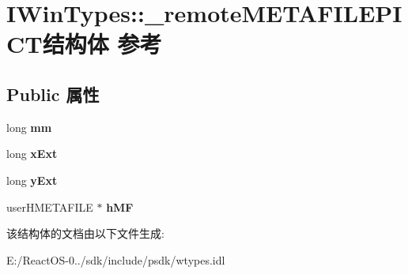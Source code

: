 \hypertarget{struct_i_win_types_1_1__remote_m_e_t_a_f_i_l_e_p_i_c_t}{}\section{I\+Win\+Types\+:\+:\+\_\+remote\+M\+E\+T\+A\+F\+I\+L\+E\+P\+I\+C\+T结构体 参考}
\label{struct_i_win_types_1_1__remote_m_e_t_a_f_i_l_e_p_i_c_t}
\subsection*{Public 属性}
\begin{DoxyCompactItemize}
\item 
\mbox{\label{struct_i_win_types_1_1__remote_m_e_t_a_f_i_l_e_p_i_c_t_a82a354a71c986941440f0d71fdf6018e}} 
long {\bfseries mm}
\item 
\mbox{\label{struct_i_win_types_1_1__remote_m_e_t_a_f_i_l_e_p_i_c_t_a1b7ec938dad90e1b64a335b2e6f9345e}} 
long {\bfseries x\+Ext}
\item 
\mbox{\label{struct_i_win_types_1_1__remote_m_e_t_a_f_i_l_e_p_i_c_t_a18d73651bd5ef1361a6f3f5471bc840d}} 
long {\bfseries y\+Ext}
\item 
\mbox{\label{struct_i_win_types_1_1__remote_m_e_t_a_f_i_l_e_p_i_c_t_a932e784dd83196633be3e6d9919751d5}} 
user\+H\+M\+E\+T\+A\+F\+I\+LE $\ast$ {\bfseries h\+MF}
\end{DoxyCompactItemize}


该结构体的文档由以下文件生成\+:\begin{DoxyCompactItemize}
\item 
E\+:/\+React\+O\+S-\/0../sdk/include/psdk/wtypes.\+idl\end{DoxyCompactItemize}
